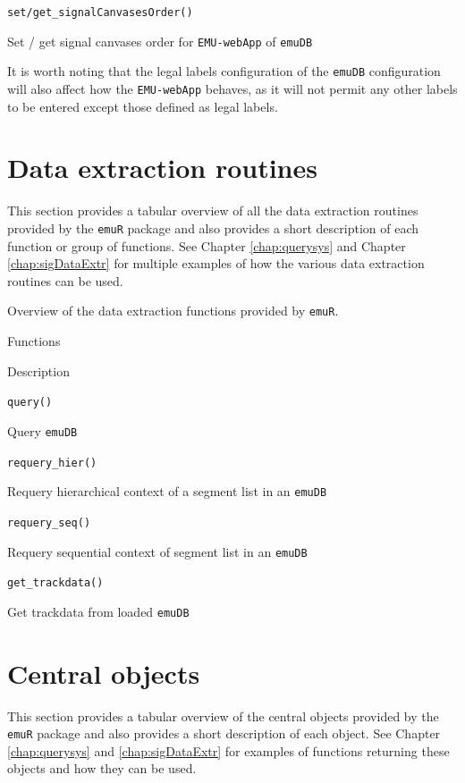 \documentclass[]{book}
\begin{document}
\texttt{set/get\_signalCanvasesOrder()}

Set / get signal canvases order for \texttt{EMU-webApp} of \texttt{emuDB}

It is worth noting that the legal labels configuration of the \texttt{emuDB} configuration will also affect how the \texttt{EMU-webApp} behaves, as it will not permit any other labels to be entered except those defined as legal labels.

\hypertarget{sec:emuRpackageDetails-dataExtr}{%
\section{Data extraction routines}\label{sec:emuRpackageDetails-dataExtr}}

This section provides a tabular overview of all the data extraction routines provided by the \texttt{emuR} package and also provides a short description of each function or group of functions. See Chapter \ref{chap:querysys} and Chapter \ref{chap:sigDataExtr} for multiple examples of how the various data extraction routines can be used.

\label{tab:emuRpackageDetails-dataExtr}Overview of the data extraction functions provided by \texttt{emuR}.

Functions

Description

\texttt{query()}

Query \texttt{emuDB}

\texttt{requery\_hier()}

Requery hierarchical context of a segment list in an \texttt{emuDB}

\texttt{requery\_seq()}

Requery sequential context of segment list in an \texttt{emuDB}

\texttt{get\_trackdata()}

Get trackdata from loaded \texttt{emuDB}

\hypertarget{sec:emuRpackageDetails-centralObjects}{%
\section{Central objects}\label{sec:emuRpackageDetails-centralObjects}}

This section provides a tabular overview of the central objects provided by the \texttt{emuR} package and also provides a short description of each object. See Chapter \ref{chap:querysys} and \ref{chap:sigDataExtr} for examples of functions returning these objects and how they can be used.
\end{document}
